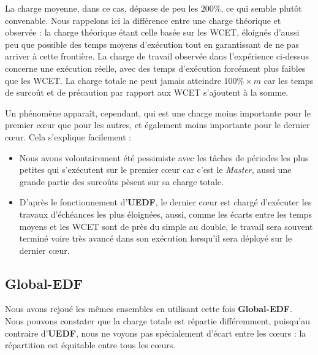 	La charge moyenne, dans ce cas, dépasse de peu les $200\%$, ce qui semble plutôt convenable. 
	Nous rappelons ici la différence entre une charge théorique et observée : 
	la charge théorique étant celle basée sur les WCET, éloignés d'aussi peu que possible des temps moyens d'exécution 
	tout en garantissant de ne pas arriver à cette frontière. La charge de travail observée dans l'expérience ci-dessus 
	concerne une exécution réelle, avec des temps d'exécution forcément plus faibles que les WCET. La charge totale 
	ne peut jamais atteindre $100\% \times m$ car les temps de surcoût et de \og{}précaution\fg{} par rapport aux WCET 
	s'ajoutent à la somme. \newline
	
	Un phénomène apparaît, cependant, qui est une charge moins importante pour le premier cœur que pour les autres, et également 
	moins importante pour le dernier cœur. Cela s'explique facilement : 
	\begin{itemize}
		\item Nous avons volontairement été pessimiste avec les tâches de périodes les plus petites qui s'exécutent sur le 
		premier cœur car c'est le \textit{Master}, aussi une grande partie des surcoûts pèsent sur sa charge totale.
		\item D'après le fonctionnement d'\textbf{UEDF}, le dernier cœur est chargé d'exécuter les travaux d'échéances les plus 
		éloignées, aussi, comme les écarts entre les temps moyens et les WCET sont de près du simple au double, 
		le travail sera souvent terminé voire très avancé dans son exécution lorsqu'il sera déployé sur le dernier cœur.
	\end{itemize}

	\subsection{Global-EDF}
	
	Nous avons rejoué les mêmes ensembles en utilisant cette fois \textbf{Global-EDF}. Nous pouvons constater que 
	la charge totale est répartie différemment, puisqu'au contraire d'\textbf{UEDF}, nous ne voyons pas spécialement d'écart 
	entre les cœurs : la répartition est équitable entre tous les cœurs. 
	
